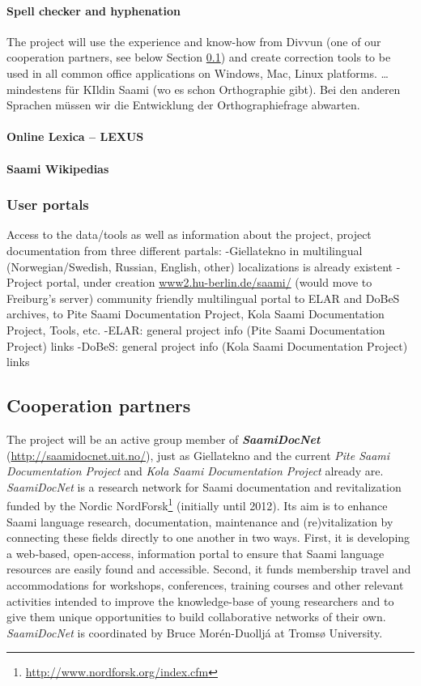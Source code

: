 \documentclass[a4paper,12pt]{article}
\begin{document}
\paragraph{Spell checker and hyphenation} 
The project will use the experience and know-how from Divvun (one of our cooperation partners, see below Section \ref{coop}) and create correction tools to be used in all common office applications on Windows, Mac, Linux platforms. … mindestens für KIldin Saami (wo es schon Orthographie gibt). Bei den anderen Sprachen müssen wir die Entwicklung der Orthographiefrage abwarten.

\paragraph{Online Lexica – LEXUS}%

\paragraph{Saami Wikipedias}%

\subsubsection{User portals}%
Access to the data/tools as well as information about the project, project documentation from three different partals:
-Giellatekno in multilingual (Norwegian/Swedish, Russian, English, other) localizations is already existent
-Project portal, under creation \url{www2.hu-berlin.de/saami/} (would move to Freiburg's server) community friendly multilingual portal to ELAR and DoBeS archives, to Pite Saami Documentation Project, Kola Saami Documentation Project, Tools, etc. 
-ELAR: general project info (Pite Saami Documentation Project) links
-DoBeS: general project info (Kola Saami Documentation Project) links

\subsection{Cooperation partners}\label{coop}%
The project will be an active group member of \textit{\textbf{SaamiDocNet}} (\url{http://saamidocnet.uit.no/}), just as Giellatekno and the current {\it Pite Saami Documentation Project} and {\it Kola Saami Documentation Project} already are. {\it SaamiDocNet} is a research network for Saami documentation and revitalization funded by the Nordic NordForsk\footnote{\url{http://www.nordforsk.org/index.cfm}} (initially until 2012). Its aim is to enhance Saami language research, documentation, maintenance and (re)vitalization by connecting these fields directly to one another in two ways. First, it is developing a web-based, open-access, information portal to ensure that Saami language resources are easily found and accessible. Second, it funds membership travel and accommodations for workshops, conferences, training courses and other relevant activities intended to improve the knowledge-base of young researchers and to give them unique opportunities to build collaborative networks of their own. {\it SaamiDocNet} is coordinated by Bruce Morén-Duolljá at Tromsø University.
\end{document}

